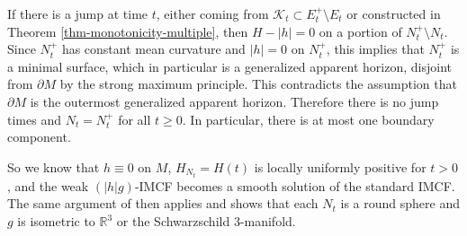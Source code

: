 \documentclass[11pt, letterpaper]{amsart}
\theoremstyle{definition}
\theoremstyle{remark}
\begin{document}
If there is a jump at time $t$, either coming from $\mathcal{K}_{t} \subset E_{t} ^+ \setminus E_{t} $ or constructed in Theorem \ref{thm-monotonicity-multiple}, then $H-|h|= 0$ on a portion of $N_t ^+ \setminus N_t $. Since $N_t ^{+}$ has constant mean curvature and $|h|=0$ on $N_t ^{+}$, this implies that $N_t ^{+}$ is a minimal surface, which in particular is a generalized apparent horizon, disjoint from $\partial M$ by the strong maximum principle. This contradicts the assumption that $\partial M$ is the outermost generalized apparent horizon. Therefore there is no jump times and $N_t = N_t ^{+}$ for all $t \geq 0$. In particular, there is at most one boundary component.

So we know that $h \equiv 0$ on $M$, $H_{N_t} = H(t)$ is locally uniformly positive for $t >0$, and the weak $(|h|g)$-IMCF becomes a smooth solution of the standard IMCF. The same argument of \cite[Section 8]{HI01} then applies and shows that each $N_{t}$ is a round sphere and $g$ is isometric to $\mathbb{R}^3$ or the Schwarzschild $3$-manifold. 
\end{document}
